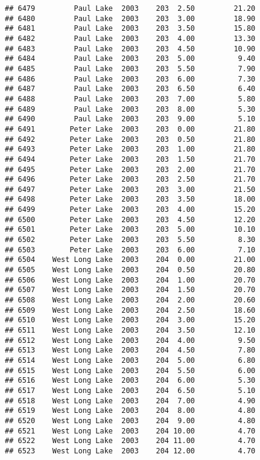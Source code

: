 \documentclass[
]{article}
\begin{document}
\begin{verbatim}
## 6479         Paul Lake  2003    203  2.50         21.20
## 6480         Paul Lake  2003    203  3.00         18.90
## 6481         Paul Lake  2003    203  3.50         15.80
## 6482         Paul Lake  2003    203  4.00         13.30
## 6483         Paul Lake  2003    203  4.50         10.90
## 6484         Paul Lake  2003    203  5.00          9.40
## 6485         Paul Lake  2003    203  5.50          7.90
## 6486         Paul Lake  2003    203  6.00          7.30
## 6487         Paul Lake  2003    203  6.50          6.40
## 6488         Paul Lake  2003    203  7.00          5.80
## 6489         Paul Lake  2003    203  8.00          5.30
## 6490         Paul Lake  2003    203  9.00          5.10
## 6491        Peter Lake  2003    203  0.00         21.80
## 6492        Peter Lake  2003    203  0.50         21.80
## 6493        Peter Lake  2003    203  1.00         21.80
## 6494        Peter Lake  2003    203  1.50         21.70
## 6495        Peter Lake  2003    203  2.00         21.70
## 6496        Peter Lake  2003    203  2.50         21.70
## 6497        Peter Lake  2003    203  3.00         21.50
## 6498        Peter Lake  2003    203  3.50         18.00
## 6499        Peter Lake  2003    203  4.00         15.20
## 6500        Peter Lake  2003    203  4.50         12.20
## 6501        Peter Lake  2003    203  5.00         10.10
## 6502        Peter Lake  2003    203  5.50          8.30
## 6503        Peter Lake  2003    203  6.00          7.10
## 6504    West Long Lake  2003    204  0.00         21.00
## 6505    West Long Lake  2003    204  0.50         20.80
## 6506    West Long Lake  2003    204  1.00         20.70
## 6507    West Long Lake  2003    204  1.50         20.70
## 6508    West Long Lake  2003    204  2.00         20.60
## 6509    West Long Lake  2003    204  2.50         18.60
## 6510    West Long Lake  2003    204  3.00         15.20
## 6511    West Long Lake  2003    204  3.50         12.10
## 6512    West Long Lake  2003    204  4.00          9.50
## 6513    West Long Lake  2003    204  4.50          7.80
## 6514    West Long Lake  2003    204  5.00          6.80
## 6515    West Long Lake  2003    204  5.50          6.00
## 6516    West Long Lake  2003    204  6.00          5.30
## 6517    West Long Lake  2003    204  6.50          5.10
## 6518    West Long Lake  2003    204  7.00          4.90
## 6519    West Long Lake  2003    204  8.00          4.80
## 6520    West Long Lake  2003    204  9.00          4.80
## 6521    West Long Lake  2003    204 10.00          4.70
## 6522    West Long Lake  2003    204 11.00          4.70
## 6523    West Long Lake  2003    204 12.00          4.70

\end{verbatim}
\end{document}
